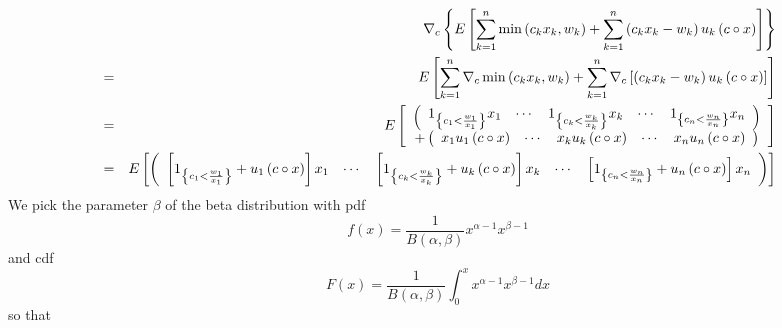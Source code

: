 \documentclass{article}
\begin{document}
\begin{eqnarray*}
&&\nabla _{c}\left\{ E\left[ \sum_{k=1}^{n}\min \left(
c_{k}x_{k},w_{k}\right) +\sum_{k=1}^{n}\left( c_{k}x_{k}-w_{k}\right)
u_{k}\left( c\circ x\right) \right] \right\}  \\
&=&E\left[ \sum_{k=1}^{n}\nabla _{c}\min \left( c_{k}x_{k},w_{k}\right)
+\sum_{k=1}^{n}\nabla _{c}\left[ \left( c_{k}x_{k}-w_{k}\right) u_{k}\left(
c\circ x\right) \right] \right]  \\
&=&E\left[ 
\begin{array}{c}
\left( 
\begin{array}{ccccc}
1_{\left\{ c_{1}<\frac{w_{1}}{x_{1}}\right\} }x_{1} & \cdots  & 1_{\left\{
c_{k}<\frac{w_{k}}{x_{k}}\right\} }x_{k} & \cdots  & 1_{\left\{ c_{n}<\frac{%
w_{n}}{x_{n}}\right\} }x_{n}%
\end{array}%
\right)  \\ 
+\left( 
\begin{array}{ccccc}
x_{1}u_{1}\left( c\circ x\right)  & \cdots  & x_{k}u_{k}\left( c\circ
x\right)  & \cdots  & x_{n}u_{n}\left( c\circ x\right) 
\end{array}%
\right) 
\end{array}%
\right]  \\
&=&E\left[ \left( 
\begin{array}{ccccc}
\left[ 1_{\left\{ c_{1}<\frac{w_{1}}{x_{1}}\right\} }+u_{1}\left( c\circ
x\right) \right] x_{1} & \cdots  & \left[ 1_{\left\{ c_{k}<\frac{w_{k}}{x_{k}%
}\right\} }+u_{k}\left( c\circ x\right) \right] x_{k} & \cdots  & \left[
1_{\left\{ c_{n}<\frac{w_{n}}{x_{n}}\right\} }+u_{n}\left( c\circ x\right) %
\right] x_{n}%
\end{array}%
\right) \right] 
\end{eqnarray*}%
We pick the parameter $\beta $ of the beta distribution with pdf%
\[
f\left( x\right) =\frac{1}{B\left( \alpha ,\beta \right) }x^{\alpha
-1}x^{\beta -1}
\]%
and cdf%
\[
F\left( x\right) =\frac{1}{B\left( \alpha ,\beta \right) }%
\int_{0}^{x}x^{\alpha -1}x^{\beta -1}dx
\]%
so that
\end{document}
